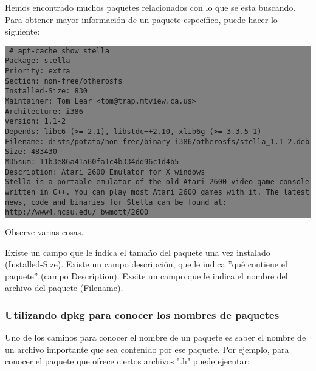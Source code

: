 \documentclass[12pt]{article}
\begin{document}
Hemos encontrado muchos paquetes relacionados con lo que se esta buscando. Para obtener mayor información de un paquete específico, puede hacer lo siguiente:

\colorbox{grey}{\parbox[t]{0.95\linewidth}{ \vspace*{0.5cm} {\tt
     \# apt-cache show stella\\
     Package: stella\\
     Priority: extra\\
     Section: non-free/otherosfs\\
     Installed-Size: 830\\
     Maintainer: Tom Lear <tom@trap.mtview.ca.us>\\
     Architecture: i386\\
     version: 1.1-2\\
     Depends: libc6 (>= 2.1), libstdc++2.10, xlib6g (>= 3.3.5-1)\\
     Filename: dists/potato/non-free/binary-i386/otherosfs/stella_1.1-2.deb\\
     Size: 483430\\
     MD5sum: 11b3e86a41a60fa1c4b334dd96c1d4b5\\
     Description: Atari 2600 Emulator for X windows\\
      Stella is a portable emulator of the old Atari 2600 video-game console\\
      written in C++. You can play most Atari 2600 games with it. The latest\\
      news, code and binaries for Stella can be found at:\\
      http://www4.ncsu.edu/~bwmott/2600\\
 } \vspace*{0.5cm} } } 

Observe varias cosas.

Existe un campo que le indica el tamaño del paquete una vez instalado (Installed-Size).
Existe un campo descripción, que le indica ''qué contiene el paquete'' (campo Description).
Exsite un campo que le indica el nombre del archivo del paquete (Filename).



\subsubsection*{Utilizando dpkg para conocer los nombres de paquetes}

Uno de los caminos para conocer el nombre de un paquete es saber el nombre de un archivo importante que sea contenido por ese paquete. Por ejemplo, para conocer el paquete que ofrece ciertos archivos ".h" puede ejecutar:
\end{document}
